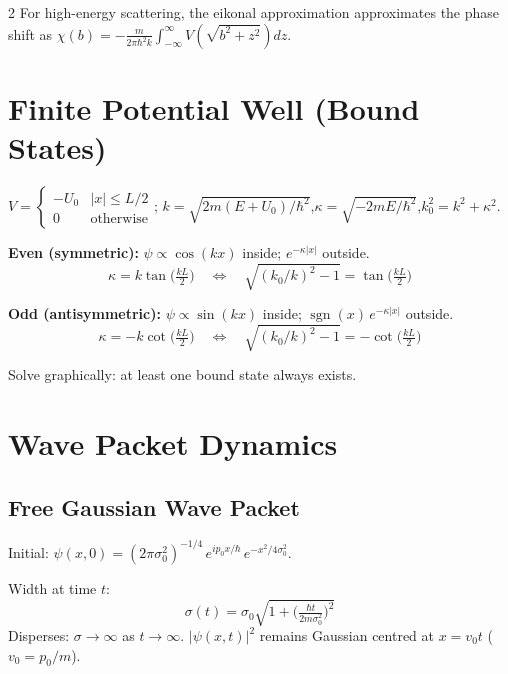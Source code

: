 \documentclass[9pt,a4paper]{article} %
\newcommand{\sgn}{\operatorname{sgn}}
\begin{document}
\begin{multicols}{2}
For high-energy scattering, the eikonal approximation approximates the phase shift as $\chi(b) = -\frac{m}{2\pi\hbar^2 k} \int_{-\infty}^{\infty} V(\sqrt{b^2 + z^2}) dz$.


\section{Finite Potential Well (Bound States)}

$V=\begin{cases}-U_0 & |x|\le L/2\\0 & \text{otherwise}\end{cases}$;\;
$k=\sqrt{2m(E+U_0)/\hbar^2}$,\;$\kappa=\sqrt{-2mE/\hbar^2}$,\;$k_0^2=k^2+\kappa^2$.

\textbf{Even (symmetric):} $\psi\propto\cos(kx)$ inside;\; $e^{-\kappa|x|}$ outside.
\[
\boxed{\kappa=k\tan\!\bigl(\tfrac{kL}{2}\bigr) \quad\Leftrightarrow\quad \sqrt{(k_0/k)^2-1}=\tan\!\bigl(\tfrac{kL}{2}\bigr)}
\]

\textbf{Odd (antisymmetric):} $\psi\propto\sin(kx)$ inside;\; $\sgn(x)\,e^{-\kappa|x|}$ outside.
\[
\boxed{\kappa=-k\cot\!\bigl(\tfrac{kL}{2}\bigr) \quad\Leftrightarrow\quad \sqrt{(k_0/k)^2-1}=-\cot\!\bigl(\tfrac{kL}{2}\bigr)}
\]

Solve graphically: at least one bound state always exists.

\section{Wave Packet Dynamics}

\subsection{Free Gaussian Wave Packet}
Initial: $\psi(x,0)=(2\pi\sigma_0^2)^{-1/4}\,e^{ip_0 x/\hbar}\,e^{-x^2/4\sigma_0^2}$.

Width at time $t$:
\[
\boxed{\sigma(t)=\sigma_0\sqrt{1+\bigl(\tfrac{\hbar t}{2m\sigma_0^2}\bigr)^{2}}}
\]
Disperses: $\sigma\to\infty$ as $t\to\infty$.\;
$|\psi(x,t)|^2$ remains Gaussian centred at $x=v_0 t$ ($v_0=p_0/m$).


\end{multicols}
\end{document}
